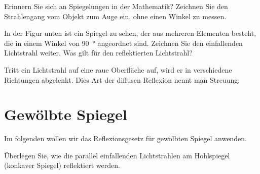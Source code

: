 \documentclass[paper=a4,twoside=true,,DIV13,BCOR1cm]{scrartcl}
\begin{document}
\newpage

\begin{aufgabe}
Erinnern Sie sich an Spiegelungen in der Mathematik? Zeichnen Sie den Strahlengang vom Objekt zum Auge ein, ohne einen Winkel zu messen.\\	
\end{aufgabe}

\begin{aufgabe}
	In der Figur unten ist ein Spiegel zu sehen, der aus mehreren Elementen besteht, die in einem Winkel von \SI{90}{\degree}
	angeordnet sind. Zeichnen Sie den einfallenden Lichtstrahl weiter. Was gilt für den reflektierten Lichtstrahl?


\end{aufgabe}


Tritt ein Lichtstrahl auf eine raue Oberfläche auf, wird er in verschiedene Richtungen abgelenkt. Dies Art der diffusen Reflexion
nennt man Streuung.


\newpage

\section{Gewölbte Spiegel}
Im folgenden wollen wir das Reflexionsgesetz für gewölbten Spiegel anwenden. 
\begin{aufgabe}
Überlegen Sie, wie die parallel einfallenden
Lichtstrahlen am Hohlspiegel (konkaver Spiegel) reflektiert werden.

\begin{center}
\end{center}
\end{aufgabe}
\end{document}
